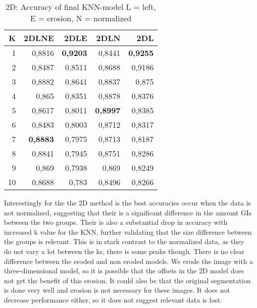 \begin{table}[H]
  \centering
    \begin{tabular}{|r|r|r|r|r|}
    \hline
    K     & 2DLNE & 2DLE  & 2DLN  & 2DL \\ \hline
    1     & 0,8816 & \textbf{0,9203} & 0,8441 & \textbf{0,9255} \\ \hline
    2     & 0,8487 & 0,8511 & 0,8688 & 0,9186 \\ \hline
    3     & 0,8882 & 0,8641 & 0,8837 & 0,875 \\ \hline
    4     & 0,865 & 0,8351 & 0,8878 & 0,8376 \\ \hline
    5     & 0,8617 & 0,8011 & \textbf{0,8997} & 0,8385 \\ \hline
    6     & 0,8483 & 0,8003 & 0,8712 & 0,8317 \\ \hline
    7     & \textbf{0,8883} & 0,7975 & 0,8713 & 0,8187 \\ \hline
    8     & 0,8841 & 0,7945 & 0,8751 & 0,8286 \\ \hline
    9     & 0,869 & 0,7938 & 0,869 & 0,8249 \\ \hline
    10    & 0,8688 & 0,783 & 0,8496 & 0,8266 \\ \hline
    \end{tabular}%
  \caption{2D: Accuracy of final KNN-model L = left, E = erosion, N = normalized}\label{tab:2DFinalModel}%
\end{table}%
Interestingly for the the 2D method is the best accuracies occur when the data is not normalized, suggesting that their is a significant difference in the amount GIs between the two groups. Their is also a substantial drop in accuracy with increased k value for the KNN, further validating that the size difference between the groups is relevant. This is in stark contrast to the normalized data, as they do not vary a lot between the ks, there is some peaks though.
There is no clear difference between the eroded and non eroded models. We erode the image with a three-dimensional model, so it is possible that the offsets in the 2D model does not get the benefit of this erosion. It could also be that the original segmentation is done very well and erosion is not necessary for these images. It does not decrease performance either, so it does not suggest relevant data is lost.

